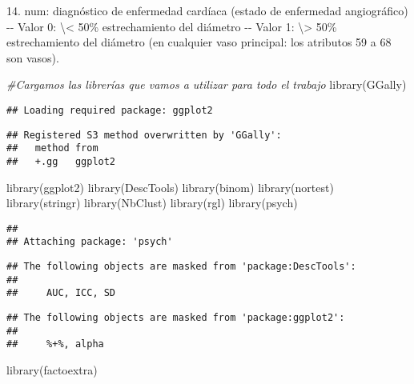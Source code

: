 \documentclass[
]{article}
\newenvironment{Shaded}{\begin{snugshade}}{\end{snugshade}}
\newcommand{\CommentTok}[1]{\textcolor[rgb]{0.56,0.35,0.01}{\textit{#1}}}
\newcommand{\FunctionTok}[1]{\textcolor[rgb]{0.00,0.00,0.00}{#1}}
\newcommand{\NormalTok}[1]{#1}
\begin{document}
14. num: diagnóstico de enfermedad cardíaca (estado de enfermedad
angiográfico) -\/- Valor 0: \textbackslash\textless{} 50\%
estrechamiento del diámetro -\/- Valor 1: \textbackslash\textgreater{}
50\% estrechamiento del diámetro (en cualquier vaso principal: los
atributos 59 a 68 son vasos).

\begin{Shaded}
\begin{Highlighting}[]
\CommentTok{\#Cargamos las librerías que vamos a utilizar para todo el trabajo}
\FunctionTok{library}\NormalTok{(GGally)}
\end{Highlighting}
\end{Shaded}

\begin{verbatim}
## Loading required package: ggplot2
\end{verbatim}

\begin{verbatim}
## Registered S3 method overwritten by 'GGally':
##   method from   
##   +.gg   ggplot2
\end{verbatim}

\begin{Shaded}
\begin{Highlighting}[]
\FunctionTok{library}\NormalTok{(ggplot2)}
\FunctionTok{library}\NormalTok{(DescTools)}
\FunctionTok{library}\NormalTok{(binom)}
\FunctionTok{library}\NormalTok{(nortest)}
\FunctionTok{library}\NormalTok{(stringr)}
\FunctionTok{library}\NormalTok{(NbClust)}
\FunctionTok{library}\NormalTok{(rgl)}
\FunctionTok{library}\NormalTok{(psych)}
\end{Highlighting}
\end{Shaded}

\begin{verbatim}
## 
## Attaching package: 'psych'
\end{verbatim}

\begin{verbatim}
## The following objects are masked from 'package:DescTools':
## 
##     AUC, ICC, SD
\end{verbatim}

\begin{verbatim}
## The following objects are masked from 'package:ggplot2':
## 
##     %+%, alpha
\end{verbatim}

\begin{Shaded}
\begin{Highlighting}[]
\FunctionTok{library}\NormalTok{(factoextra)}
\end{Highlighting}
\end{Shaded}
\end{document}
